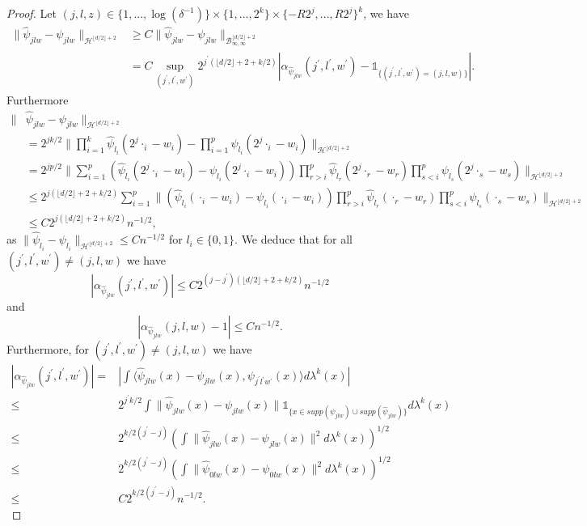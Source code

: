\documentclass[10pt]{article}
\begin{document}
\begin{proof}
Let $(j,l,z)\in \{1,...,\log(\delta^{-1})\}\times \{1,...,2^k\}\times \{-R2^{j},...,R2^j\}^k$, we have 
\begin{align*}
    \|\hat{\psi}_{jlw}-\psi_{jlw}\|_{\mathcal{H}^{\lfloor d/2 \rfloor +2}} & \geq C \|\hat{\psi}_{jlw}-\psi_{jlw}\|_{\mathcal{B}^{\lfloor d/2 \rfloor +2}_{\infty,\infty}}\\
    & = C\sup \limits_{(j^{'},l^{'},w^{'})}2^{j^{'}(\lfloor d/2 \rfloor +2+k/2)}|\alpha_{\hat{\psi}_{jlw}}(j^{'},l^{'},w^{'})-\mathds{1}_{\{(j^{'},l^{'},w^{'})=(j,l,w)\}}|.
\end{align*}
Furthermore
\begin{align*}
    \|& \hat{\psi}_{jlw}-\psi_{jlw}\|_{\mathcal{H}^{\lfloor d/2 \rfloor +2}} \\
    &=2^{jk/2}\|\prod \limits_{i=1}^k \hat{\psi}_{l_i}(2^j\cdot_i-w_i)-\prod \limits_{i=1}^p \psi_{l_i}(2^j\cdot_i-w_i)\|_{\mathcal{H}^{\lfloor d/2 \rfloor +2}}\\
    & =2^{jp/2}\|\sum \limits_{i=1}^p (\hat{\psi}_{l_i}(2^j\cdot_i-w_i)-\psi_{l_i}(2^j\cdot_i-w_i))\prod \limits_{r>i}^p \hat{\psi}_{l_r}(2^j\cdot_r-w_r)\prod \limits_{s<i}^p \psi_{l_s}(2^j\cdot_s-w_s)\|_{\mathcal{H}^{\lfloor d/2 \rfloor +2}}\\
    & \leq 2^{j(\lfloor d/2 \rfloor +2+k/2)}\sum \limits_{i=1}^p \| (\hat{\psi}_{l_i}(\cdot_i-w_i)-\psi_{l_i}(\cdot_i-w_i))\prod \limits_{r>i}^p \hat{\psi}_{l_r}(\cdot_r-w_r)\prod \limits_{s<i}^p \psi_{l_s}(\cdot_s-w_s)\|_{\mathcal{H}^{\lfloor d/2 \rfloor +2}}\\
    & \leq C 2^{j(\lfloor d/2 \rfloor +2+k/2)}n^{-1/2},
\end{align*}
as $\|\hat{\psi}_{l_i}-\psi_{l_i}\|_{\mathcal{H}^{\lfloor d/2 \rfloor +2}} \leq Cn^{-1/2}$ for $l_i\in \{0,1\}$.
We deduce that for all $(j^{'},l^{'},w^{'})\neq(j,l,w)$ we have
$$
|\alpha_{\hat{\psi}_{jlw}}(j^{'},l^{'},w^{'})|\leq C2^{(j-j^{'})(\lfloor d/2 \rfloor +2+k/2)}n^{-1/2}
$$
and 
$$
|\alpha_{\hat{\psi}_{jlw}}(j,l,w)-1|\leq Cn^{-1/2}.
$$
Furthermore, for $(j^{'},l^{'},w^{'})\neq(j,l,w)$ we have
\begin{align*}
    |\alpha_{\hat{\psi}_{jlw}}(j^{'},l^{'},w^{'})|=&|\int \langle \hat{\psi}_{jlw}(x)-\psi_{jlw}(x),\psi_{j^{'}l^{'}w^{'}}(x) \rangle d\lambda^k(x) |\\
    \leq & 2^{j^{'}k/2}\int \| \hat{\psi}_{jlw}(x)-\psi_{jlw}(x)\| \mathds{1}_{\{x\in supp(\psi_{jlw})\cup supp(\hat{\psi}_{jlw}) \}}d\lambda^k(x) \\
    \leq & 2^{k/2(j^{'}-j)}\left(\int \| \hat{\psi}_{jlw}(x)-\psi_{jlw}(x)\|^2d\lambda^k(x)\right)^{1/2} \\
    \leq & 2^{k/2(j^{'}-j)}\left(\int \| \hat{\psi}_{0lw}(x)-\psi_{0lw}(x)\|^2d\lambda^k(x)\right)^{1/2}  \\
    \leq & C 2^{k/2(j^{'}-j)}n^{-1/2}.
\end{align*}


\end{proof}
\end{document}
